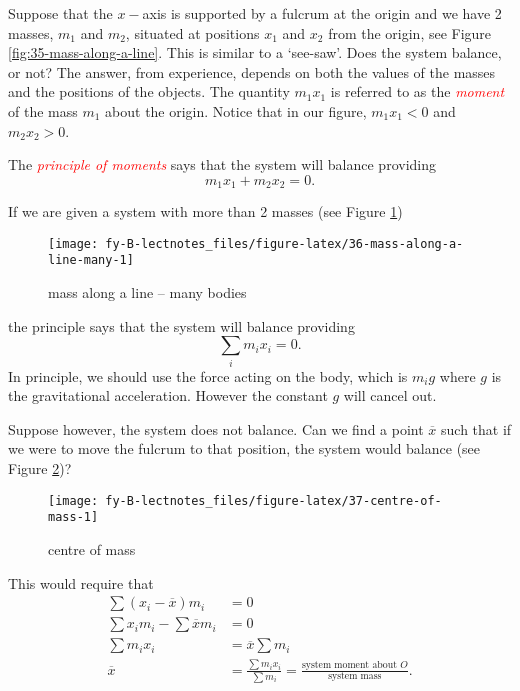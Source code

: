 \documentclass[
  11pt,
  oneside]{book}
\newcommand{\slide}{}
\theoremstyle{definition}
\theoremstyle{definition}
\theoremstyle{definition}
\theoremstyle{definition}
\theoremstyle{remark}
\begin{document}
Suppose that the \(x-\)axis is supported by a fulcrum at the origin and we have 2 masses, \(m_1\) and \(m_2\), situated at positions \(x_1\) and \(x_2\) from the origin, see Figure \ref{fig:35-mass-along-a-line}. This is similar to a `see-saw'. Does the system balance, or not? The answer, from experience, depends on both the values of the masses and the positions of the objects. The quantity \(m_1x_1\) is referred to as the \textcolor{red}{\em moment} of the mass \(m_1\) about the origin. Notice that in our figure, \(m_1x_1<0\) and \(m_2x_2>0\).

The \textcolor{red}{\em principle of moments} says that the system will balance providing
\[
m_1x_1 + m_2x_2 = 0.
\]

\slide

If we are given a system with more than 2 masses (see Figure \ref{fig:36-mass-along-a-line-many})

\begin{figure}

{\centering \texttt{[image: fy-B-lectnotes\_files/figure-latex/36-mass-along-a-line-many-1]} 

}

\caption{mass along a line -- many bodies}\label{fig:36-mass-along-a-line-many}
\end{figure}

the principle says that the system will balance providing
\[
\sum_i m_ix_i = 0.
\]
In principle, we should use the force acting on the body, which is \(m_ig\) where \(g\) is the gravitational acceleration. However the constant \(g\) will cancel out.
\slide
Suppose however, the system does not balance. Can we find a point \(\overline x\) such that if we were to move the fulcrum to that position, the system would balance (see Figure \ref{fig:37-centre-of-mass})?

\begin{figure}

{\centering \texttt{[image: fy-B-lectnotes\_files/figure-latex/37-centre-of-mass-1]} 

}

\caption{centre of mass}\label{fig:37-centre-of-mass}
\end{figure}

This would require that
\begin{align*}
\sum(x_i-\overline x)m_i& = 0\\
\sum x_i m_i-\sum{\overline x}m_i& = 0\\
\sum m_ix_i&=\overline x\sum m_i\\
\overline x&=\frac{\sum m_ix_i}{\sum m_i}=\frac{\text{system moment about $O$}}{\text{system mass}}.
\end{align*}
\end{document}
